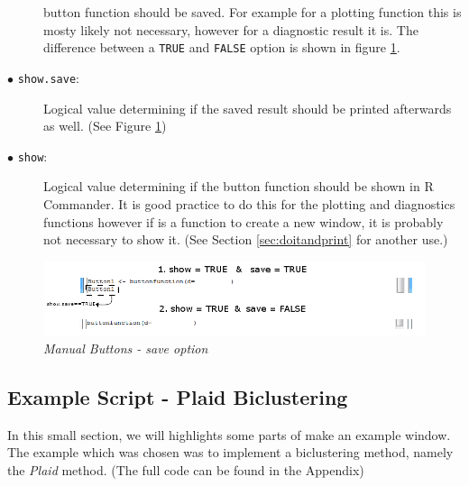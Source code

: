 \documentclass[a4paper]{article}\usepackage[]{graphicx}\usepackage[]{color}
\begin{document}
\begin{description}
  button function should be saved. For example for a plotting function this is
  mosty likely not necessary, however for a diagnostic result it is. The
  difference between a \verb|TRUE| and \verb|FALSE| option is shown in figure
  \ref{manualbutton_showsave}.
  \item[$\bullet$ \texttt{show.save}:] Logical value determining if the saved
  result should be printed afterwards as well. (See Figure \ref{manualbutton_showsave})
  \item[$\bullet$ \texttt{show}:] Logical value determining if the button
  function should be shown in R Commander. It is good practice to do this for
  the plotting and diagnostics functions however if is a function to create a
  new window, it is probably not necessary to show it. (See Section
  \ref{sec:doitandprint} for another use.)

\end{description}


\begin{figure}[H]
\centering
\includegraphics[scale=0.5]{figures/manualbutton_showsave.png}
\caption{{\it Manual Buttons - save option}
\label{manualbutton_showsave}}
\end{figure}

\subsection{Example Script - Plaid Biclustering}
In this small section, we will highlights some parts of make an example window.
The example which was chosen was to implement a biclustering method, namely the
{\it Plaid} method. (The full code can be found in the Appendix)
\end{document}

